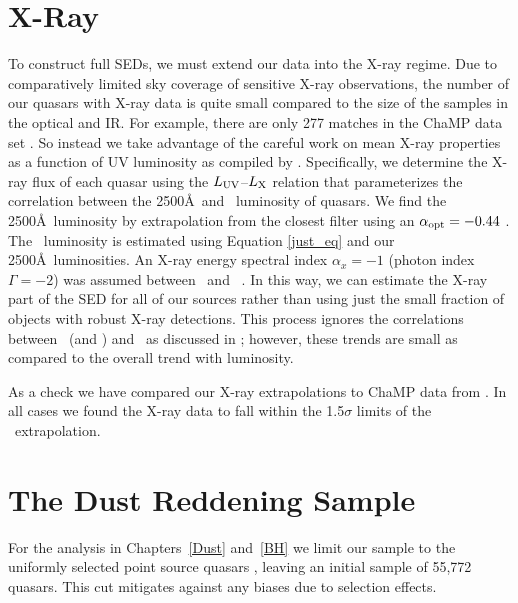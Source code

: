\section{X-Ray} \label{X-ray}

To construct full SEDs, we must extend our data into the X-ray regime.  Due to comparatively limited sky coverage of sensitive X-ray observations, the number of our quasars with X-ray data is quite small compared to the size of the samples in the optical and IR.  For example, there are only 277 matches in the ChaMP data set \citep{Green:2009}.
So instead we take advantage of the careful work on mean X-ray properties as a function of UV luminosity as compiled by \citet{Steffen:2006}.  Specifically, we determine the X-ray flux of each quasar using the $L_{\rm UV}$--$L_{\rm X}$ relation that parameterizes the correlation between the 2500\AA\ and \twokev\ luminosity of quasars. We find the 2500\AA\ luminosity by extrapolation from the closest filter using an $\alpha_{\rm opt}=-0.44$ \citep{Vanden-Berk:2001}.  The \twokev\ luminosity is estimated using Equation \ref{just_eq} and our 2500\AA\ luminosities.  An X-ray energy spectral index $\alpha_x=-1$ (photon index $\Gamma=-2$) was assumed between \twohundredev\ and \tenkev\ \citep[e.g. ][]{George:2000}.  In this way, we can estimate the X-ray part of the SED for all of our sources rather than using just the small fraction of objects with robust X-ray detections. This process ignores the correlations between \aox\ (and \alphauv) and \ax\ as discussed in \citet{Kruczek:2011}; however, these trends are small as compared to the overall trend with luminosity.  

As a check we have compared our X-ray extrapolations to ChaMP data from \citet[][see Section \ref{sed}]{Green:2009}. In all cases we found the X-ray data to fall within the 1.5$\sigma$ limits of the \aox\ extrapolation. 

\section{The Dust Reddening Sample} \label{Dust_data}

For the analysis in Chapters~\ref{Dust} and~\ref{BH} we limit our sample to the uniformly selected point source quasars \citep{Richards:2006a}, leaving an initial sample of 55,772 quasars. This cut mitigates against any biases due to selection effects.

